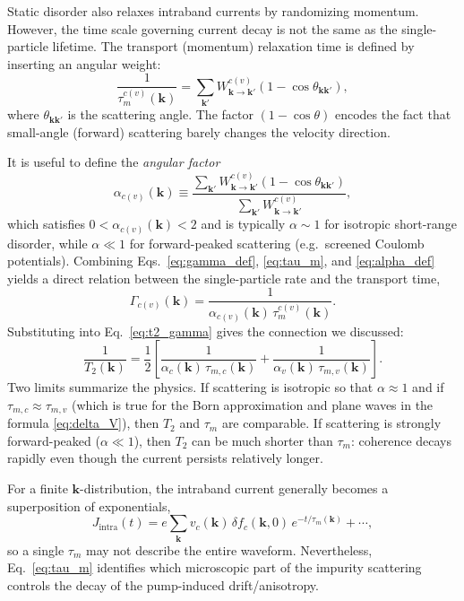 Static disorder also relaxes intraband currents by randomizing momentum. However, the time scale governing current decay is not the same as the single-particle lifetime. The transport (momentum) relaxation time is defined by inserting an angular weight:
\begin{equation}
\frac{1}{\tau_{m}^{c(v)}(\mathbf{k})}
=
\sum_{\mathbf{k}'}
W_{\mathbf{k}\to\mathbf{k}'}^{c(v)}\left(1-\cos\theta_{\mathbf{k}\mathbf{k}'}\right),
\label{eq:tau_m}
\end{equation}
where $\theta_{\mathbf{k}\mathbf{k}'}$ is the scattering angle. The factor $(1-\cos\theta)$ encodes the fact that small-angle (forward) scattering barely changes the velocity direction.

It is useful to define the \emph{angular factor}
\begin{equation}
\alpha_{c(v)}(\mathbf{k})\equiv
\frac{\sum_{\mathbf{k}'} W_{\mathbf{k}\to\mathbf{k}'}^{c(v)}\left(1-\cos\theta_{\mathbf{k}\mathbf{k}'}\right)}
{\sum_{\mathbf{k}'} W_{\mathbf{k}\to\mathbf{k}'}^{c(v)}},
\label{eq:alpha_def}
\end{equation}
which satisfies $0<\alpha_{c(v)}(\mathbf{k})< 2$ and is typically $\alpha\sim 1$ for isotropic short-range disorder, while $\alpha\ll 1$ for forward-peaked scattering (e.g.\ screened Coulomb potentials). Combining Eqs.~\eqref{eq:gamma_def}, \eqref{eq:tau_m}, and \eqref{eq:alpha_def} yields a direct relation between the single-particle rate and the transport time,
\begin{equation}
\Gamma_{c(v)}(\mathbf{k})=\frac{1}{\alpha_{c(v)}(\mathbf{k})\,\tau_{m}^{c(v)}(\mathbf{k})}.
\end{equation}
Substituting into Eq.~\eqref{eq:t2_gamma} gives the connection we discussed:
\begin{equation}
\frac{1}{T_2(\mathbf{k})}
=
\frac{1}{2}\left[
\frac{1}{\alpha_c(\mathbf{k})\,\tau_{m,c}(\mathbf{k})}
+
\frac{1}{\alpha_v(\mathbf{k})\,\tau_{m,v}(\mathbf{k})}
\right].
\label{eq:t2_tau_m}
\end{equation}
Two limits summarize the physics. If scattering is isotropic so that $\alpha\approx 1$ and if $\tau_{m,c}\approx \tau_{m,v}$ (which is true for the Born approximation and plane waves in the formula \ref{eq:delta_V}), then $T_2$ and $\tau_m$ are comparable. If scattering is strongly forward-peaked ($\alpha\ll 1$), then $T_2$ can be much shorter than $\tau_m$: coherence decays rapidly even though the current persists relatively longer.

For a finite $\mathbf{k}$-distribution, the intraband current generally becomes a superposition of exponentials,
\begin{equation}
J_{\mathrm{intra}}(t)=e\sum_{\mathbf{k}} v_c(\mathbf{k})\,\delta f_c(\mathbf{k},0)\,e^{-t/\tau_m(\mathbf{k})}+\cdots,
\end{equation}
so a single $\tau_m$ may not describe the entire waveform. Nevertheless, Eq.~\eqref{eq:tau_m} identifies which microscopic part of the impurity scattering controls the decay of the pump-induced drift/anisotropy.




